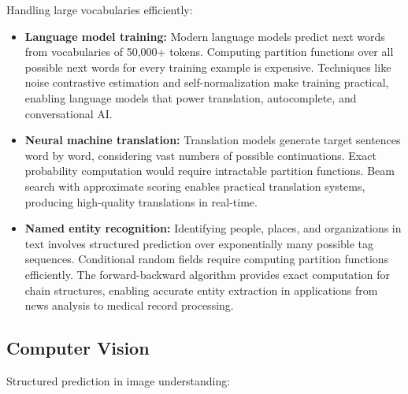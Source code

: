 Handling large vocabularies efficiently:

\begin{itemize}
    \item \textbf{Language model training:} Modern language models predict next words from vocabularies of 50,000+ tokens. Computing partition functions over all possible next words for every training example is expensive. Techniques like noise contrastive estimation and self-normalization make training practical, enabling language models that power translation, autocomplete, and conversational AI.
    
    \item \textbf{Neural machine translation:} Translation models generate target sentences word by word, considering vast numbers of possible continuations. Exact probability computation would require intractable partition functions. Beam search with approximate scoring enables practical translation systems, producing high-quality translations in real-time.
    
    \item \textbf{Named entity recognition:} Identifying people, places, and organizations in text involves structured prediction over exponentially many possible tag sequences. Conditional random fields require computing partition functions efficiently. The forward-backward algorithm provides exact computation for chain structures, enabling accurate entity extraction in applications from news analysis to medical record processing.
\end{itemize}

\subsection{Computer Vision}

Structured prediction in image understanding:

